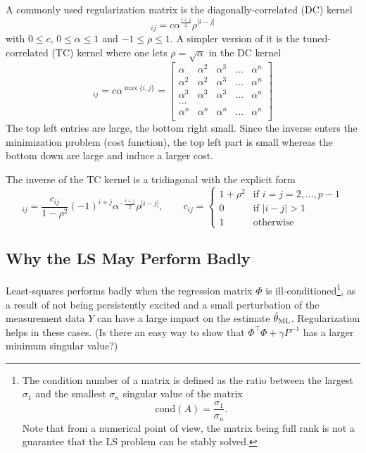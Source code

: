 A commonly used regularization matrix is the diagonally-correlated (DC) kernel
\begin{equation*}
  [P]_{ij} = c\alpha^{\frac{i+j}{2}}\rho^{|i-j|}
\end{equation*}
with $0 \le c$, $0 \le \alpha \le 1$ and $-1 \le \rho \le 1$. A simpler version of it is the tuned-correlated (TC) kernel where one lets $\rho = \sqrt{\alpha}$ in the DC kernel
\begin{equation*}
  [P]_{ij} = c\alpha^{\max\{i,j\}} =
  \begin{bmatrix}
    \alpha   & \alpha^2 & \alpha^3 & \ldots & \alpha^n \\
    \alpha^2 & \alpha^2 & \alpha^3 & \ldots & \alpha^n \\
    \alpha^3 & \alpha^3 & \alpha^3 & \ldots & \alpha^n \\
    \ldots \\
    \alpha^n & \alpha^n & \alpha^n & \ldots & \alpha^n \\
  \end{bmatrix}
\end{equation*}
The top left entries are large, the bottom right small. Since the inverse enters the minimization problem (cost function), the top left part is small whereas the bottom down are large and induce a larger cost.

The inverse of the TC kernel is a tridiagonal with the explicit form
\begin{equation*}
  [P{-1}]_{ij} = \frac{c_{ij}}{1-\rho^2}(-1)^{i+j}\alpha^{-\frac{i+j}{2}}\rho^{|i-j|},\hspace{2em} c_{ij} =
  \begin{cases}
    1 + \rho^2 & \textrm{if } i=j=2,\ldots,p-1 \\
    0 & \textrm{if } |i-j| > 1 \\
    1 & \textrm{otherwise}
  \end{cases}
\end{equation*}

\subsection{Why the LS May Perform Badly}
\label{sec:LS-illconditioned}

Least-squares performs badly when the regression matrix $\Phi$ is ill-conditioned\footnote{The condition number of a matrix is defined as the ratio between the largest $\sigma_1$ and the smallest $\sigma_n$ singular value of the matrix
  \begin{equation*}
    \textrm{cond}(A) = \frac{\sigma_1}{\sigma_n}.
  \end{equation*}
  Note that from a numerical point of view, the matrix being full rank is not a guarantee that the LS problem can be stably solved.}, as a result of not being persistently excited and a small perturbation of the measurement data $Y$ can have a large impact on the estimate $\hat{\theta}_\textrm{ML}$. Regularization helps in these cases. (Is there an easy way to show that $\Phi^\top\Phi + \gamma P^{-1}$ has a larger minimum singular value?)

